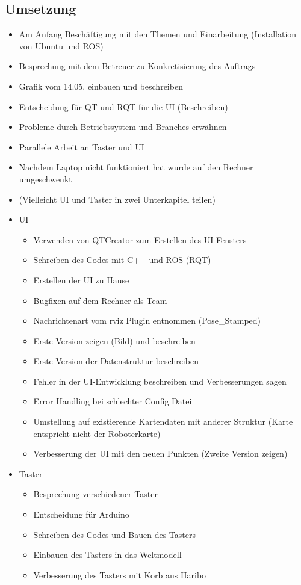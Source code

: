 \documentclass[a4paper,12pt,headsepline,toc=flat]{scrartcl}
\begin{document}
	\subsection{Umsetzung}
		\begin{itemize}
			\item Am Anfang Beschäftigung mit den Themen und Einarbeitung (Installation von Ubuntu und ROS)
			\item Besprechung mit dem Betreuer zu Konkretisierung des Auftrags
			\item Grafik vom 14.05. einbauen und beschreiben 
			\item Entscheidung für QT und RQT für die UI (Beschreiben)
			\item Probleme durch Betriebssystem und Branches erwähnen
			\item Parallele Arbeit an Taster und UI
			\item Nachdem Laptop nicht funktioniert hat wurde auf den Rechner umgeschwenkt
			\item (Vielleicht UI und Taster in zwei Unterkapitel teilen)
			\item UI
			\begin{itemize}
				\item Verwenden von QTCreator zum Erstellen des UI-Fensters
				\item Schreiben des Codes mit C++ und ROS (RQT)
				\item Erstellen der UI zu Hause
				\item Bugfixen auf dem Rechner als Team
				\item Nachrichtenart vom rviz Plugin entnommen (Pose{\_}Stamped)
				\item Erste Version zeigen (Bild) und beschreiben
				\item Erste Version der Datenstruktur beschreiben
				\item Fehler in der UI-Entwicklung beschreiben und Verbesserungen sagen
				\item Error Handling bei schlechter Config Datei
				\item Umstellung auf existierende Kartendaten mit anderer Struktur (Karte entspricht nicht der Roboterkarte)
				\item Verbesserung der UI mit den neuen Punkten (Zweite Version zeigen)
			\end{itemize}
			
			\item Taster
			\begin{itemize}
				\item Besprechung verschiedener Taster
				\item Entscheidung für Arduino
				\item Schreiben des Codes und Bauen des Tasters
				\item Einbauen des Tasters in das Weltmodell
				\item Verbesserung des Tasters mit Korb aus Haribo
			\end{itemize}
			

\end{itemize}
\end{document}
